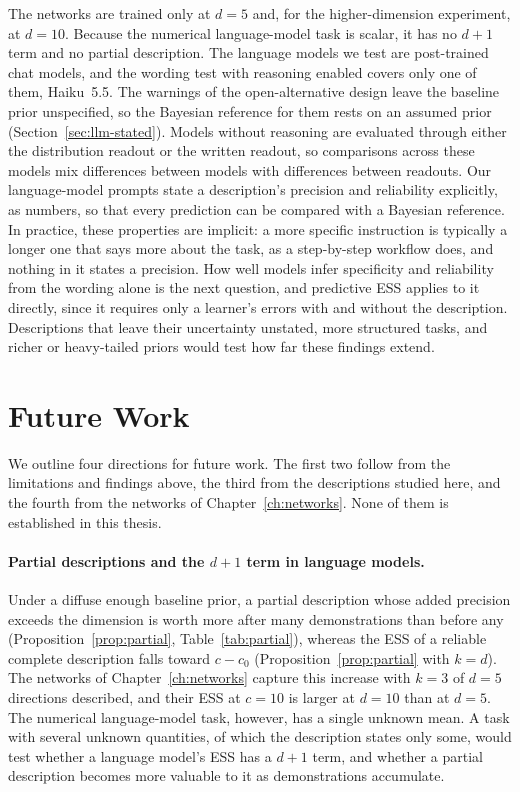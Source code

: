 The networks are trained only at $d=5$ and, for the higher-dimension experiment, at $d=10$. Because the numerical language-model task is scalar, it has no $d+1$ term and no partial description. The language models we test are post-trained chat models, and the wording test with reasoning enabled covers only one of them, Haiku~5.5. The warnings of the open-alternative design leave the baseline prior unspecified, so the Bayesian reference for them rests on an assumed prior (Section~\ref{sec:llm-stated}). Models without reasoning are evaluated through either the distribution readout or the written readout, so comparisons across these models mix differences between models with differences between readouts. Our language-model prompts state a description's precision and reliability explicitly, as numbers, so that every prediction can be compared with a Bayesian reference. In practice, these properties are implicit: a more specific instruction is typically a longer one that says more about the task, as a step-by-step workflow does, and nothing in it states a precision. How well models infer specificity and reliability from the wording alone is the next question, and predictive ESS applies to it directly, since it requires only a learner's errors with and without the description. Descriptions that leave their uncertainty unstated, more structured tasks, and richer or heavy-tailed priors \citep{dalal1983,ohagan2012} would test how far these findings extend.

\section{Future Work}\label{sec:future}

We outline four directions for future work. The first two follow from the limitations and findings above, the third from the descriptions studied here, and the fourth from the networks of Chapter~\ref{ch:networks}. None of them is established in this thesis.

\paragraph{Partial descriptions and the $d+1$ term in language models.}
Under a diffuse enough baseline prior, a partial description whose added precision exceeds the dimension is worth more after many demonstrations than before any (Proposition~\ref{prop:partial}, Table~\ref{tab:partial}), whereas the ESS of a reliable complete description falls toward $c-c_0$ (Proposition~\ref{prop:partial} with $k=d$). The networks of Chapter~\ref{ch:networks} capture this increase with $k=3$ of $d=5$ directions described, and their ESS at $c=10$ is larger at $d=10$ than at $d=5$. The numerical language-model task, however, has a single unknown mean. A task with several unknown quantities, of which the description states only some, would test whether a language model's ESS has a $d+1$ term, and whether a partial description becomes more valuable to it as demonstrations accumulate.

